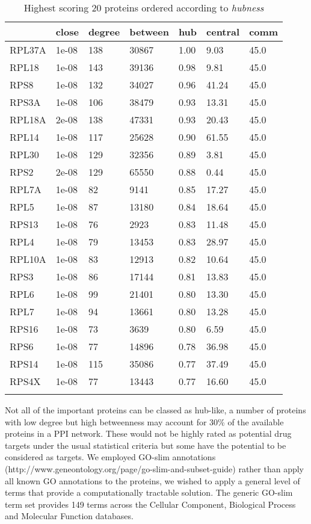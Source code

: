 \documentclass[a4paper,8pt,twocolumn,5p]{elsarticle}
\begin{document}
\begin{table}[ht]
\centering  \scriptsize \caption{Highest scoring 20 proteins ordered according to {\it hubness}}
\label{hub}
\begin{tabular}{lllllll}
  \hline
 & close & degree & between & hub & central & comm \\ 
  \hline
RPL37A & 1e-08 & 138 & 30867 & 1.00 & 9.03 & 45.0 \\ 
  RPL18 & 1e-08 & 143 & 39136 & 0.98 & 9.81 & 45.0 \\ 
  RPS8 & 1e-08 & 132 & 34027 & 0.96 & 41.24 & 45.0 \\ 
  RPS3A & 1e-08 & 106 & 38479 & 0.93 & 13.31 & 45.0 \\ 
  RPL18A & 2e-08 & 138 & 47331 & 0.93 & 20.43 & 45.0 \\ 
  RPL14 & 1e-08 & 117 & 25628 & 0.90 & 61.55 & 45.0 \\ 
  RPL30 & 1e-08 & 129 & 32356 & 0.89 & 3.81 & 45.0 \\ 
  RPS2 & 2e-08 & 129 & 65550 & 0.88 & 0.44 & 45.0 \\ 
  RPL7A & 1e-08 & 82 & 9141 & 0.85 & 17.27 & 45.0 \\ 
  RPL5 & 1e-08 & 87 & 13180 & 0.84 & 18.64 & 45.0 \\ 
  RPS13 & 1e-08 & 76 & 2923 & 0.83 & 11.48 & 45.0 \\ 
  RPL4 & 1e-08 & 79 & 13453 & 0.83 & 28.97 & 45.0 \\ 
  RPL10A & 1e-08 & 83 & 12913 & 0.82 & 10.64 & 45.0 \\ 
  RPS3 & 1e-08 & 86 & 17144 & 0.81 & 13.83 & 45.0 \\ 
  RPL6 & 1e-08 & 99 & 21401 & 0.80 & 13.30 & 45.0 \\ 
  RPL7 & 1e-08 & 94 & 13661 & 0.80 & 13.28 & 45.0 \\ 
  RPS16 & 1e-08 & 73 & 3639 & 0.80 & 6.59 & 45.0 \\ 
  RPS6 & 1e-08 & 77 & 14896 & 0.78 & 36.98 & 45.0 \\ 
  RPS14 & 1e-08 & 115 & 35086 & 0.77 & 37.49 & 45.0 \\ 
  RPS4X & 1e-08 & 77 & 13443 & 0.77 & 16.60 & 45.0 \\ 
   \hline \normalsize
\end{tabular}
\end{table}

Not all of the important proteins can be classed as hub-like, a number of proteins with low degree but high betweenness  may account for 30\% of the available proteins in a PPI network. These would not be highly rated as potential drug targets under the usual statistical criteria but some have the potential to be considered as targets. We employed GO-slim annotations (http://www.geneontology.org/page/go-slim-and-subset-guide) rather than apply all known GO annotations to the proteins,  we wished to apply a general level of terms that provide a computationally tractable solution. The generic GO-slim term set provides 149 terms across the Cellular Component, Biological Process and Molecular Function databases.
\end{document}
